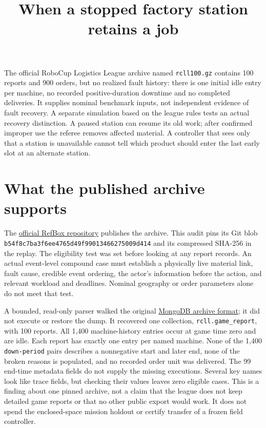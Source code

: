\documentclass[11pt]{article}
\title{When a stopped factory station retains a job}
\date{}
\begin{document}
\maketitle

The official RoboCup Logistics League archive named \texttt{rcll100.gz}
contains 100 reports and 900 orders, but no realized fault history:
there is one initial idle entry per machine, no recorded positive-duration
downtime and no completed deliveries. It supplies nominal benchmark
inputs, not independent evidence of fault recovery. A separate simulation
based on the league rules tests an actual recovery distinction. A paused
station can resume its old work; after confirmed improper use the
referee removes affected material. A controller that sees only that
a station is unavailable cannot tell which product should enter
the last early slot at an alternate station.

\section{What the published archive supports}
The \href{https://github.com/robocup-logistics/rcll-refbox/tree/master/benchmarks}{official
RefBox repository} publishes the archive. This audit pins its Git blob
\texttt{b54f8c7ba3f6ee4765d49f99013466275009d414}
and its compressed SHA-256 in the replay. The eligibility test was set
before looking at any report records. An actual event-level compound
case must establish a physically live material link, fault cause,
credible event ordering, the actor's information before the action,
and relevant workload and deadlines. Nominal geography or order
parameters alone do not meet that test.

A bounded, read-only parser walked the original
\href{https://pkg.go.dev/github.com/mongodb/mongo-tools/common/archive}{MongoDB
archive format}; it did not execute or restore the dump. It recovered
one collection, \texttt{rcll.game\_report}, with 100 reports. All 1,400
machine-history entries occur at game time zero and are idle.
Each report has exactly one entry per named machine. None of the
1,400 \texttt{down-period} pairs describes a nonnegative start and
later end, none of the broken reasons is populated, and no recorded
order unit was delivered. The 99 end-time metadata fields do not
supply the missing executions. Several key names look like trace
fields, but checking their values leaves zero eligible cases. This
is a finding about one pinned archive, not a claim that the league
does not keep detailed game reports or that no other public export
would work. It does not spend the enclosed-space mission holdout or
certify transfer of a frozen field controller.
\end{document}
